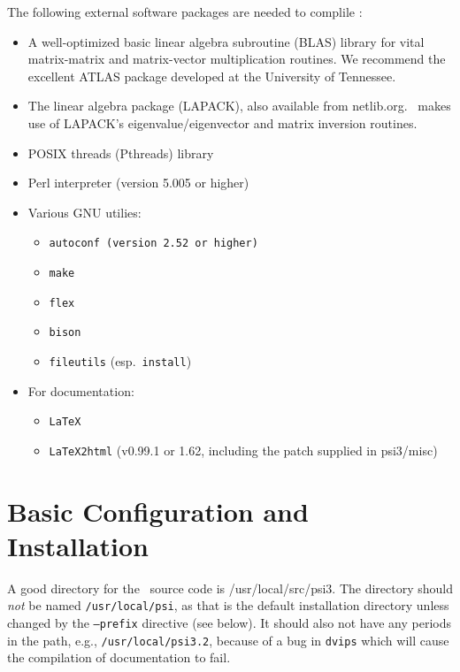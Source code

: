 \documentclass[12pt]{article}
\begin{document}
The following external software packages are needed to complile \PSIthree:
\begin{itemize}
\item A well-optimized basic linear algebra subroutine (BLAS) library
  for vital matrix-matrix and matrix-vector multiplication routines.
  We recommend the excellent ATLAS package developed at the University
  of Tennessee.  
\item The linear algebra package (LAPACK), also available from
  netlib.org.  \PSIthree\ makes use of LAPACK's eigenvalue/eigenvector
  and matrix inversion routines.  
\item POSIX threads (Pthreads) library
\item Perl interpreter (version 5.005 or higher)
\item Various GNU utilies: 
\begin{itemize}
\item {\tt autoconf (version 2.52 or higher)}
\item {\tt make}
\item {\tt flex}
\item {\tt bison}
\item {\tt fileutils} (esp.\ {\tt install})
\end{itemize}
\item For documentation:
\begin{itemize}
\item {\tt LaTeX}
\item {\tt LaTeX2html} (v0.99.1 or 1.62, including the patch supplied in
psi3/misc)
\end{itemize}
\end{itemize}

\section{Basic Configuration and Installation}

A good directory for the \PSIthree\ source code is /usr/local/src/psi3.
The directory should {\em not} be named {\tt /usr/local/psi}, as that is
the default installation directory unless changed by the {\tt --prefix}
directive (see below).  It should also not have any periods in the path,
e.g., {\tt /usr/local/psi3.2}, because of a bug in {\tt dvips} which will
cause the compilation of documentation to fail.
\end{document}
